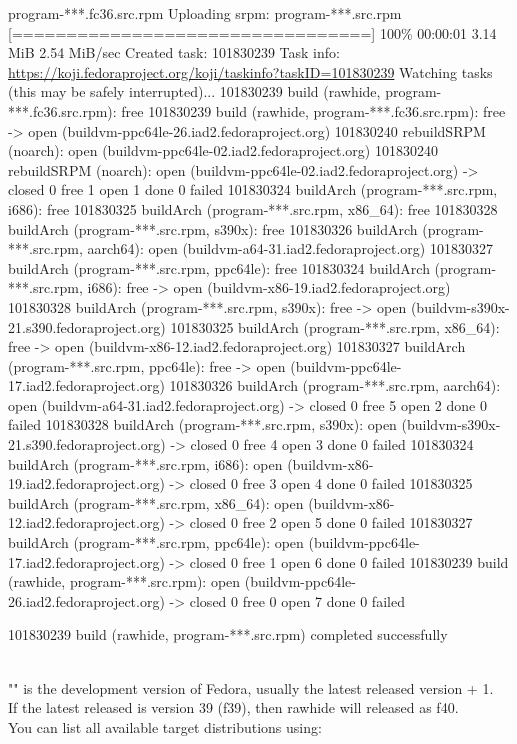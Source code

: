{\scriptsize{
\begin{script}
\fprompt{~}    program-***.fc36.src.rpm
Uploading srpm:  program-***.src.rpm
[=================================] 100\% 00:00:01   3.14 MiB   2.54 MiB/sec
Created task: 101830239
Task info: \href{https://koji.fedoraproject.org/koji/taskinfo?taskID=101830239}{https://koji.fedoraproject.org/koji/taskinfo?taskID=101830239}
Watching tasks (this may be safely interrupted)...
101830239 build (rawhide, program-***.fc36.src.rpm): free
101830239 build (rawhide, program-***.fc36.src.rpm): free -> open (buildvm-ppc64le-26.iad2.fedoraproject.org)
  101830240 rebuildSRPM (noarch): open (buildvm-ppc64le-02.iad2.fedoraproject.org)
  101830240 rebuildSRPM (noarch): open (buildvm-ppc64le-02.iad2.fedoraproject.org) -> closed
  0 free  1 open  1 done  0 failed
  101830324 buildArch (program-***.src.rpm, i686): free
  101830325 buildArch (program-***.src.rpm, x86\_64): free
  101830328 buildArch (program-***.src.rpm, s390x): free
  101830326 buildArch (program-***.src.rpm, aarch64): open (buildvm-a64-31.iad2.fedoraproject.org)
  101830327 buildArch (program-***.src.rpm, ppc64le): free
  101830324 buildArch (program-***.src.rpm, i686): free -> open (buildvm-x86-19.iad2.fedoraproject.org)
  101830328 buildArch (program-***.src.rpm, s390x): free -> open (buildvm-s390x-21.s390.fedoraproject.org)
  101830325 buildArch (program-***.src.rpm, x86\_64): free -> open (buildvm-x86-12.iad2.fedoraproject.org)
  101830327 buildArch (program-***.src.rpm, ppc64le): free -> open (buildvm-ppc64le-17.iad2.fedoraproject.org)
  101830326 buildArch (program-***.src.rpm, aarch64): open (buildvm-a64-31.iad2.fedoraproject.org) -> closed
  0 free  5 open  2 done  0 failed
  101830328 buildArch (program-***.src.rpm, s390x): open (buildvm-s390x-21.s390.fedoraproject.org) -> closed
  0 free  4 open  3 done  0 failed
  101830324 buildArch (program-***.src.rpm, i686): open (buildvm-x86-19.iad2.fedoraproject.org) -> closed
  0 free  3 open  4 done  0 failed
  101830325 buildArch (program-***.src.rpm, x86\_64): open (buildvm-x86-12.iad2.fedoraproject.org) -> closed
  0 free  2 open  5 done  0 failed
  101830327 buildArch (program-***.src.rpm, ppc64le): open (buildvm-ppc64le-17.iad2.fedoraproject.org) -> closed
  0 free  1 open  6 done  0 failed
101830239 build (rawhide, program-***.src.rpm): open (buildvm-ppc64le-26.iad2.fedoraproject.org) -> closed
  0 free  0 open  7 done  0 failed

101830239 build (rawhide, program-***.src.rpm) completed successfully
\end{script}
}}
\\
\noindent "\texttt{}" is the development version of Fedora, usually the latest released
version + 1. \\
If the latest released is version 39 (f39), then rawhide will released as f40. \\
You can list all available target distributions using:
{\footnotesize{
\begin{script}
\fprompt{~}  
\end{script}
}}

